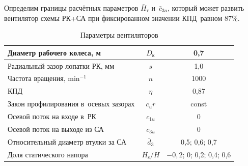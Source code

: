 
Определим границы расчётных параметров \(\bar{H}_\text{т}\) и~\(\bar{c}_{3a}\), который может развить вентилятор схемы РК+СА при фиксированном значении КПД~равном 87\%.

\begin{table}[htb]
	\centering
	\caption{Параметры вентиляторов}
	\label{tab:ParamSt}
	\begin{tabular}{l|c|c}
		Диаметр рабочего колеса, м~& \(D_\text{к}\) & 0,7\\
		\hline
		Радиальный зазор лопатки РК, мм & \(s\) & 1,0 \\
		\hline
		Частота вращения, \(\si\minute^{-1}\) & \(n\) & 1000\\
		\hline
	 КПД~& \(\eta\) & 0,87\\
		\hline
		Закон профилирования в~осевых зазорах & \(c_{u}r\) & const \\
		\hline
		Осевой поток на входе в~РК & \(c_{1u}\) & 0 \\
		\hline
		Осевой поток на выходе из СА & \(c_{3u}\) & 0 \\
		\hline
		Относительный диаметр втулки за СА & \(\bar{d}_3\) & 0,5; 0,6; 0,7 \\
		\hline
		Доля статического напора & \(H_\text{s}/H\) & \(-0,2\); 0; 0,2; 0,4; 0,6 \\
		\end{tabular}
\end{table}




